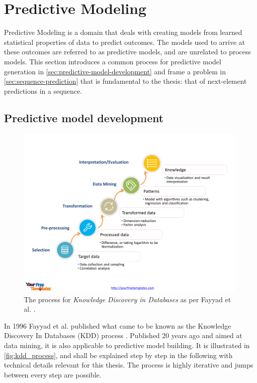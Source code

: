 \section{Predictive Modeling}\label{sec:predictive-modeling}
Predictive Modeling is a domain that deals with creating models from learned statistical properties of data to predict outcomes. The models used to arrive at these outcomes are referred to as predictive models, and are unrelated to process models. This section introduces a common process for predictive model generation in \autoref{sec:predictive-model-development} and frame a problem in \autoref{sec:sequence-prediction} that is fundamental to the thesis: that of next-element predictions in a sequence.

\subsection{Predictive model development}
\label{sec:predictive-model-development} 
\begin{figure}
	\centering
	\includegraphics[width=\textwidth]{gfx/kdd_process.png}
	\caption{The process for \textit{Knowledge Discovery in Databases} as per Fayyad et al. \cite{fayyad1996data}.}
	\label{fig:kdd_process}
\end{figure}

In 1996 Fayyad et al. published what came to be known as the Knowledge Discovery In Databases (KDD) process \cite{fayyad1996data}. Published 20 years ago and aimed at data mining, it is also applicable to predictive model building. It is illustrated in \autoref{fig:kdd_process}, and shall be explained step by step in the following with technical details relevant for this thesis. The process is highly iterative and jumps between every step are possible.

